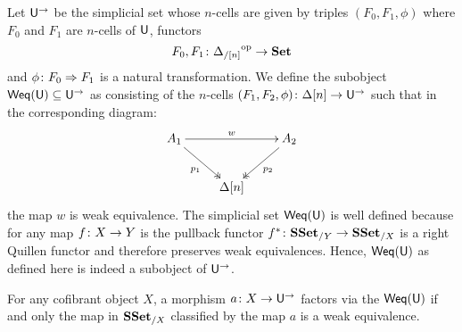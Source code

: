 \documentclass[reqno,10pt,a4paper,oneside,draft]{amsart}
\begin{document}
 Let $\mathsf{U}^{\rightarrow}$ be the simplicial set whose $n$-cells are given by triples $(F_0, F_1, \phi)$ where
 $F_0$ and $F_1$ are $n$-cells of $\mathsf{U}$, \ie functors
 \[
F_0, F_1 \colon {\Delta_{/[n]}}^{\operatorname{op}} \rightarrow \mathbf{Set}
\]
and $\phi \colon F_0 \Rightarrow F_1$ is a natural transformation. We define the subobject $\mathsf{Weq}(\mathsf{U}) \subseteq \mathsf{U}^{\rightarrow}$ as consisting of the 
$n$-cells $(F_1, F_2, \phi) \colon \Delta[n] \rightarrow \mathsf{U}^{\rightarrow}$ such that in the corresponding diagram:
\[
\xymatrix{ 
A_1 \ar[rr]^{w} \ar@{->>}[dr]_{p_1} & & A_2 \ar@{->>}[dl]^{p_2} \\
& \Delta[n] & }
\]
the map $w$ is weak equivalence. The simplicial set $\mathsf{Weq}(\mathsf{U})$ is well defined because for any map $f \colon X \rightarrow Y$ is the pullback functor $f^* \colon \mathbf{SSet}_{/Y} \rightarrow \mathbf{SSet}_{/X}$ is a right Quillen functor and therefore preserves weak equivalences. Hence, 
$\mathsf{Weq}(\mathsf{U})$ as defined here is indeed a subobject of $\mathsf{U}^{\rightarrow}$.

\begin{proposition}
\label{prop:Weq_classify_Weq}
For any cofibrant object $X$, a morphism $a \colon X \rightarrow \mathsf{U}^{\rightarrow}$ factors via the 
 $\mathsf{Weq}(\mathsf{U})$ if and only the map in $\mathbf{SSet}_{/X}$ classified by the map $a$ is a weak equivalence.

\end{proposition}
\end{document}
